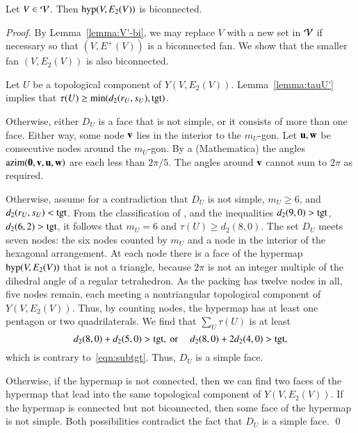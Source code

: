 \documentclass{llncs}
\def\op#1{{\hbox{#1}}}
\begin{document}
\begin{lemma}[biconnected]\label{lemma:biconnected}
  Let $V\in {\mathcal V}$.  Then $\op{hyp}(V,E_2(V))$ is biconnected.
\end{lemma}

\begin{proof}
  By Lemma~\ref{lemma:V'-bi}, we may replace $V$ with a new set in
  ${\mathcal V}$ if necessary so that $(V,E^+(V))$ is a biconnected fan.
   We  show that the smaller
  fan $(V,E_2(V))$ is also biconnected.

  Let $U$ be a topological component of $Y(V,E_2(V))$.  Lemma~\ref{lemma:tauU'}
   implies that $\tau(U)\ge \min(d_2(r_U,s_U),\op{tgt})$.

    Otherwise,
   either $D_U$ is a face that is not simple, or it consists of more than
   one face.  Either way, some node ${\mathbf v}$ lies in the interior to the
   $m_U$-gon.  Let ${\mathbf u},{\mathbf w}$ be consecutive nodes around the $m_U$-gon.
   By a %
  {(Mathematica)} the angles
   $\op{azim}(\orz,\v,\u,\w)$ are each less than $2\pi/5$. The angles
   around ${\mathbf v}$ cannot sum to $2\pi$ as required.

     Otherwise, assume
   for a contradiction that $D_U$ is not simple, $m_U\ge 6$, and
   $d_2(r_U,s_U)<\op{tgt}$.  From the classification of
   \cite[p.~126,~Fig.~12.1]{Hales:2006:DCG}, and the inequalities
   $d_2(9,0) > \op{tgt}$, $d_2(6,2) > \op{tgt}$, it follows that 
    $m_U=6$ and $\tau(U)\ge d_2(8,0)$.  The set $D_U$ meets seven
   nodes: the six nodes counted by $m_U$ and a node in the interior of
   the hexagonal arrangement.  At each node there is a face of the
   hypermap $\op{hyp}(V,E_2(V))$ that is not a triangle, because
   $2\pi$ is not an integer multiple of the dihedral angle of a
   regular tetrahedron.  As the packing has twelve nodes in all, five
   nodes remain, each meeting a nontriangular topological component of
   $Y(V,E_2(V))$.  Thus, by counting nodes, the hypermap has at least
   one pentagon or two quadrilaterals.  We find that $\sum_{U}
   \tau(U)$ is at least
\[
d_2(8,0) + d_2(5,0) > \op{tgt}, \text{ or }\quad d_2(8,0) + 2 d_2(4,0) > \op{tgt},
\]
which is contrary to~\eqref{eqn:subtgt}.
Thus, $D_U$ is a simple face.
%
%

  Otherwise, if the hypermap is
not connected, then we can find two faces of the hypermap that lead
into the same topological component of $Y(V,E_2(V))$.  If the
hypermap is connected but not biconnected, then some face of the
hypermap is not simple.  Both possibilities contradict the fact that
$D_U$ is a simple face.
\qed\end{proof}
\end{document}
